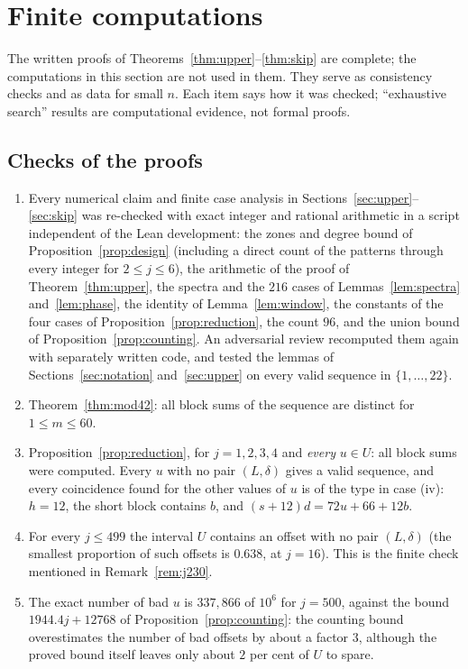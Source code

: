 \documentclass[11pt]{amsart}
\theoremstyle{remark}
\begin{document}
\section{Finite computations}\label{sec:computations}

The written proofs of Theorems~\ref{thm:upper}--\ref{thm:skip} are complete; the computations in this section are not used in them. They serve as consistency checks and as data for
small $n$. Each item says how it was checked; ``exhaustive search'' results are computational evidence, not formal proofs.

\subsection*{Checks of the proofs}
\begin{enumerate}
\item Every numerical claim and finite case analysis in Sections~\ref{sec:upper}--\ref{sec:skip} was re-checked with exact integer and
rational arithmetic in a script independent of the Lean development: the zones and degree bound of Proposition~\ref{prop:design}
(including a direct count of the patterns through every integer for $2\le j\le6$), the arithmetic of the proof of Theorem~\ref{thm:upper},
the spectra and the $216$ cases of Lemmas~\ref{lem:spectra} and~\ref{lem:phase}, the identity of Lemma~\ref{lem:window}, the constants
of the four cases of Proposition~\ref{prop:reduction}, the count $96$, and the union bound of Proposition~\ref{prop:counting}.
An adversarial review recomputed them again with separately written code, and tested the lemmas of Sections~\ref{sec:notation}
and~\ref{sec:upper} on every valid sequence in $\{1,\dots,22\}$.
\item Theorem~\ref{thm:mod42}: all block sums of the sequence are distinct for $1\le m\le60$.
\item Proposition~\ref{prop:reduction}, for $j=1,2,3,4$ and \emph{every} $u\in U$: all block sums were computed. Every $u$ with no pair
$(L,\delta)$ gives a valid sequence, and every coincidence found for the other values of $u$ is of the type in case (iv): $h=12$, the short
block contains $b$, and $(s+12)d=72u+66+12b$.
\item For every $j\le499$ the interval $U$ contains an offset with no pair $(L,\delta)$ (the smallest proportion of such offsets is
$0.638$, at $j=16$). This is the finite check mentioned in Remark~\ref{rem:j230}.
\item The exact number of bad $u$ is $337{,}866$ of $10^6$ for $j=500$, against the bound $1944.4j+12768$ of
Proposition~\ref{prop:counting}: the counting bound overestimates the number of bad offsets by about a factor $3$, although the
proved bound itself leaves only about $2$ per cent of $U$ to spare.
\end{enumerate}
\end{document}
